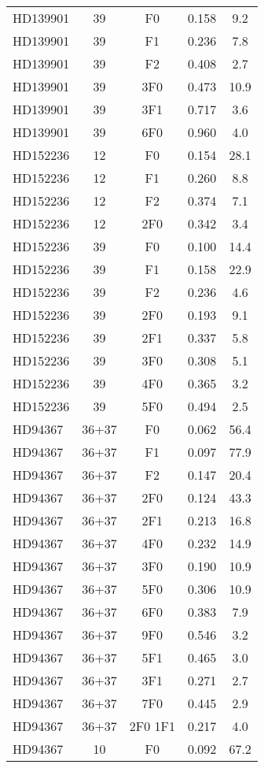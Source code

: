 \begin{table*}
\begin{tabular}{l c c c c}
\hline
HD139901 & 39 & F0 & 0.158 & 9.2\\ 
HD139901 & 39 & F1 & 0.236 & 7.8\\ 
HD139901 & 39 & F2 & 0.408 & 2.7\\ 
HD139901 & 39 & 3F0 & 0.473 & 10.9\\ 
HD139901 & 39 & 3F1 & 0.717 & 3.6\\ 
HD139901 & 39 & 6F0 & 0.960 & 4.0\\ 
\hline
HD152236 & 12 & F0 & 0.154 & 28.1\\ 
HD152236 & 12 & F1 & 0.260 & 8.8\\ 
HD152236 & 12 & F2 & 0.374 & 7.1\\ 
HD152236 & 12 & 2F0 & 0.342 & 3.4\\ 
\hline
HD152236 & 39 & F0 & 0.100 & 14.4\\ 
HD152236 & 39 & F1 & 0.158 & 22.9\\ 
HD152236 & 39 & F2 & 0.236 & 4.6\\ 
HD152236 & 39 & 2F0 & 0.193 & 9.1\\ 
HD152236 & 39 & 2F1 & 0.337 & 5.8\\ 
HD152236 & 39 & 3F0 & 0.308 & 5.1\\ 
HD152236 & 39 & 4F0 & 0.365 & 3.2\\ 
HD152236 & 39 & 5F0 & 0.494 & 2.5\\ 
\hline
HD94367 & 36+37 & F0 & 0.062 & 56.4\\ 
HD94367 & 36+37 & F1 & 0.097 & 77.9\\ 
HD94367 & 36+37 & F2 & 0.147 & 20.4\\ 
HD94367 & 36+37 & 2F0 & 0.124 & 43.3\\ 
HD94367 & 36+37 & 2F1 & 0.213 & 16.8\\ 
HD94367 & 36+37 & 4F0 & 0.232 & 14.9\\ 
HD94367 & 36+37 & 3F0 & 0.190 & 10.9\\ 
HD94367 & 36+37 & 5F0 & 0.306 & 10.9\\ 
HD94367 & 36+37 & 6F0 & 0.383 & 7.9\\ 
HD94367 & 36+37 & 9F0 & 0.546 & 3.2\\ 
HD94367 & 36+37 & 5F1 & 0.465 & 3.0\\ 
HD94367 & 36+37 & 3F1 & 0.271 & 2.7\\ 
HD94367 & 36+37 & 7F0 & 0.445 & 2.9\\ 
HD94367 & 36+37 & 2F0 1F1 & 0.217 & 4.0\\ 
\hline
HD94367 & 10 & F0 & 0.092 & 67.2\\ 

\end{tabular}
\end{table*}
